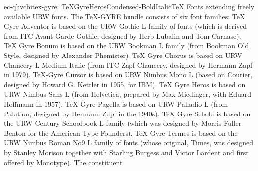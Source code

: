 \documentclass{ddltxtyp}
\begin{document}
\begin{package}{ec-qhvcbi}{tex-gyre: TeXGyreHerosCondensed-BoldItalic}{{\TeX} Fonts extending freely available URW fonts.}
The {\TeX}-GYRE bundle consists of six font families: {\TeX} Gyre
Adventor is based on the URW Gothic L family of fonts (which is
derived from ITC Avant Garde Gothic, designed by Herb Lubalin
and Tom Carnase). {\TeX} Gyre Bonum is based on the URW Bookman L
family (from Bookman Old Style, designed by Alexander
Phemister). {\TeX} Gyre Chorus is based on URW Chancery L Medium
Italic (from ITC Zapf Chancery, designed by Hermann Zapf in
1979). {\TeX}-Gyre Cursor is based on URW Nimbus Mono L (based on
Courier, designed by Howard G. Kettler in 1955, for IBM). {\TeX}
Gyre Heros is based on URW Nimbus Sans L (from Helvetica,
prepared by Max Miedinger, with Eduard Hoffmann in 1957). {\TeX}
Gyre Pagella is based on URW Palladio L (from Palation,
designed by Hermann Zapf in the 1940s). {\TeX} Gyre Schola is
based on the URW Century Schoolbook L family (which was
designed by Morris Fuller Benton for the American Type
Founders). {\TeX} Gyre Termes is based on the URW Nimbus Roman No9
L family of fonts (whose original, Times, was designed by
Stanley Morison together with Starling Burgess and Victor
Lardent and first offered by Monotype). The constituent
\end{package}
\end{document}
